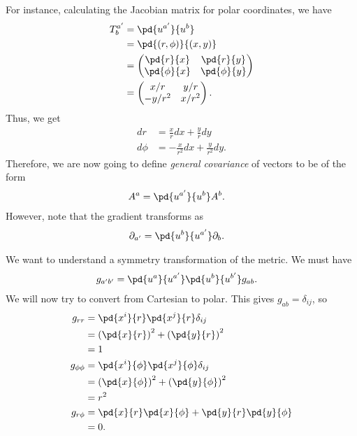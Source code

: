 \documentclass[10pt]{mypackage}
\begin{document}
  For instance, calculating the Jacobian matrix for polar coordinates, we have
  \begin{align*}
    T_{b}^{a'} &= \pd{u^{a'}}{u^{b}}\\
               &= \pd{\left( r,\phi \right)}{\left( x,y \right)}\\
               &= \begin{pmatrix}\pd{r}{x} & \pd{r}{y}\\\pd{\phi}{x} & \pd{\phi}{y}\end{pmatrix}\\
               &= \begin{pmatrix}x/r & y/r \\ -y/r^2 & x/r^2\end{pmatrix}.
  \end{align*}
  Thus, we get
  \begin{align*}
    dr &= \frac{x}{r}dx + \frac{y}{r}dy\\
    d\phi &= -\frac{x}{r^2}dx + \frac{y}{r^2}dy.
  \end{align*}
  Therefore, we are now going to define \textit{general covariance} of vectors to be of the form
  \begin{align*}
    A^{a} &= \pd{u^{a'}}{u^{b}}A^{b}.
  \end{align*}
  However, note that the gradient transforms as
  \begin{align*}
    \partial_{a'} &= \pd{u^{b}}{u^{a'}} \partial_{b}.
  \end{align*}
  \begin{example}
    We want to understand a symmetry transformation of the metric. We must have
    \begin{align*}
      g_{a'b'} &= \pd{u^{a}}{u^{a'}} \pd{u^{b}}{u^{b'}}g_{ab}.
    \end{align*}
    We will now try to convert from Cartesian to polar. This gives $g_{ab} = \delta_{ij}$, so
    \begin{align*}
      g_{rr} &= \pd{x^{i}}{r}\pd{x^{j}}{r}\delta_{ij}\\
             &= \left( \pd{x}{r} \right)^2 + \left( \pd{y}{r} \right)^2\\
             &= 1\\
      g_{\phi \phi} &= \pd{x^{i}}{\phi} \pd{x^{j}}{\phi}\delta_{ij}\\
                    &= \left( \pd{x}{\phi} \right)^2 + \left( \pd{y}{\phi} \right)^2\\
                    &= r^2\\
      g_{r\phi} &= \pd{x}{r}\pd{x}{\phi} + \pd{y}{r}\pd{y}{\phi}\\
                &= 0.
    \end{align*}
  \end{example}
\end{document}

